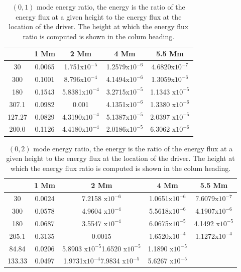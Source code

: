 \documentclass[preprint,authoryear,12pt]{elsarticle}
\begin{document}
\begin{table}[h]
\centering
\begin{tabular}{c c c c c }
\hline
   &  1 Mm & 2 Mm & 4 Mm & 5.5 Mm \\
\hline
30 &  0.0065 & 1.751x$10^{-5}$ &  1.2579x$10^{-6}$ & 4.6820x$10^{-7}$ \\
\hline
300 & 0.1001 & 8.796x$10^{-4}$ &  4.1494x$10^{-6}$ &  1.3059x$10^{-6}$ \\
\hline
180 & 0.1543 &  5.8381x$10^{-4}$ &  3.2715x$10^{-5}$ &  1.1343 x$10^{-5}$ \\
\hline
307.1 & 0.0982 & 0.001 & 4.1351x$10^{-6}$ & 1.3380 x$10^{-6}$  \\
\hline
127.27 & 0.0829 &  4.3190x$10^{-4}$ &  5.1387x$10^{-5}$ & 2.0397 x$10^{-5}$ \\ 
\hline
200.0 & 0.1126 &  4.4180x$10^{-4}$ &  2.0186x$10^{-5}$ & 6.3062 x$10^{-6}$ \\
\hline
\end{tabular} 
\caption{ $(0, 1)$ mode energy ratio, the energy is the ratio of the energy flux at a given height to the energy flux at the location of the driver. The height at which the energy flux ratio is computed is shown in the colum heading.}
\label{Table01mode}
\end{table}

\begin{table}[h]
\centering
\begin{tabular}{c c c c c }
\hline
   &  1 Mm & 2 Mm & 4 Mm & 5.5 Mm \\
\hline
30 &  0.0024 & 7.2158 x$10^{-6}$ & 1.0651x$10^{-6}$ & 7.6079x$10^{-7}$\\
\hline
300 & 0.0578 & 4.9604 x$10^{-4}$ & 5.5618x$10^{-6}$ & 4.1907x$10^{-6}$\\
\hline
180 & 0.0687 & 3.5547 x$10^{-4}$ & 6.0675x$10^{-5}$ & 4.1492 x$10^{-5}$\\
\hline
205.1 & 0.3135 & 0.0015 &1.6520x$10^{-4}$ & 1.1272x$10^{-4}$\\
\hline
84.84 & 0.0206 &5.8903 x$10^{-5}$1.6520 x$10^{-5}$ & 1.1890 x$10^{-5}$\\
\hline
133.33 & 0.0497 & 1.9731x$10^{-4}$7.9834 x$10^{-5}$ & 5.6267 x$10^{-5}$\\
\hline
\end{tabular} 
\caption{ $(0, 2)$ mode energy ratio, the energy is the ratio of the energy flux at a given height to the energy flux at the location of the driver. The height at which the energy flux ratio is computed is shown in the colum heading.}
\label{Table02mode}
\end{table}
\end{document}
